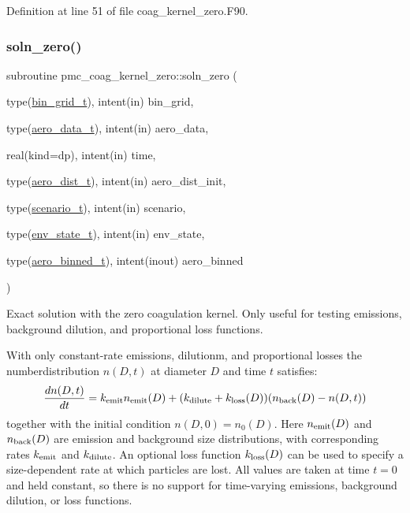 Definition at line 51 of file coag\+\_\+kernel\+\_\+zero.\+F90.

\mbox{\label{namespacepmc__coag__kernel__zero_af04cc325508f88c203c444b94f09cc51}} 
\subsubsection{\texorpdfstring{soln\+\_\+zero()}{soln\_zero()}}
{\footnotesize\ttfamily subroutine pmc\+\_\+coag\+\_\+kernel\+\_\+zero\+::soln\+\_\+zero (\begin{DoxyParamCaption}\item[{type(\mbox{\hyperlink{structpmc__bin__grid_1_1bin__grid__t}{bin\+\_\+grid\+\_\+t}}), intent(in)}]{bin\+\_\+grid,  }\item[{type(\mbox{\hyperlink{structpmc__aero__data_1_1aero__data__t}{aero\+\_\+data\+\_\+t}}), intent(in)}]{aero\+\_\+data,  }\item[{real(kind=dp), intent(in)}]{time,  }\item[{type(\mbox{\hyperlink{structpmc__aero__dist_1_1aero__dist__t}{aero\+\_\+dist\+\_\+t}}), intent(in)}]{aero\+\_\+dist\+\_\+init,  }\item[{type(\mbox{\hyperlink{structpmc__scenario_1_1scenario__t}{scenario\+\_\+t}}), intent(in)}]{scenario,  }\item[{type(\mbox{\hyperlink{structpmc__env__state_1_1env__state__t}{env\+\_\+state\+\_\+t}}), intent(in)}]{env\+\_\+state,  }\item[{type(\mbox{\hyperlink{structpmc__aero__binned_1_1aero__binned__t}{aero\+\_\+binned\+\_\+t}}), intent(inout)}]{aero\+\_\+binned }\end{DoxyParamCaption})}



Exact solution with the zero coagulation kernel. Only useful for testing emissions, background dilution, and proportional loss functions. 

With only constant-\/rate emissions, dilutionm, and proportional losses the numberdistribution $n(D,t)$ at diameter $D$ and time $t$ satisfies\+: \[ \frac{d n(D,t)}{dt} = k_{\rm emit} n_{\rm emit}(D) + (k_{\rm dilute} + k_{\rm loss}(D)) (n_{\rm back}(D) - n(D,t)) \] together with the initial condition $ n(D,0) = n_0(D) $. Here $n_{\rm emit}(D)$ and $n_{\rm back}(D)$ are emission and background size distributions, with corresponding rates $k_{\rm emit}$ and $k_{\rm dilute}$. An optional loss function $k_{\rm loss}(D)$ can be used to specify a size-\/dependent rate at which particles are lost. All values are taken at time $t = 0$ and held constant, so there is no support for time-\/varying emissions, background dilution, or loss functions.

